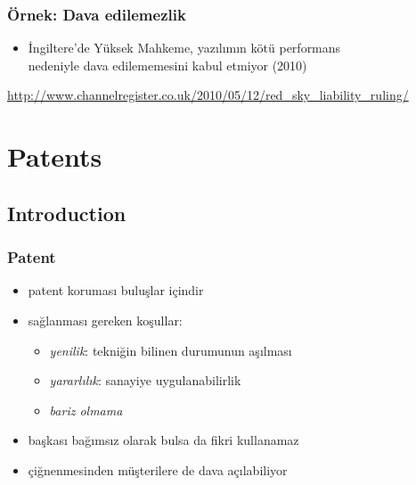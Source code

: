 \documentclass[dvipsnames]{beamer}
\theoremstyle{definition}
\theoremstyle{example}
\theoremstyle{plain}
\begin{document}
\begin{frame}
  \frametitle{Örnek: Dava edilemezlik}

  \begin{center}
  \end{center}

  \begin{itemize}
    \item İngiltere'de Yüksek Mahkeme, yazılımın kötü performans\\
      nedeniyle dava edilememesini kabul etmiyor (2010)
  \end{itemize}

  \medskip
  \tiny{\url{http://www.channelregister.co.uk/2010/05/12/red_sky_liability_ruling/}}\\
\end{frame}

\section{Patents}

\subsection{Introduction}

\begin{frame}
  \frametitle{Patent}

  \begin{itemize}
    \item patent koruması \alert{buluşlar} içindir

    \medskip
    \item sağlanması gereken koşullar:
    \begin{itemize}
      \item \emph{yenilik}: tekniğin bilinen durumunun aşılması
      \item \emph{yararlılık}: sanayiye uygulanabilirlik
      \item \emph{bariz olmama}
    \end{itemize}

    \pause
    \medskip
    \item başkası bağımsız olarak bulsa da fikri kullanamaz

    \pause
    \medskip
    \item çiğnenmesinden müşterilere de dava açılabiliyor
  \end{itemize}
\end{frame}
\end{document}
